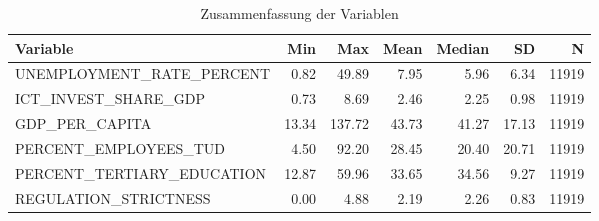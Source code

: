 
\begin{table}[!h]
\centering
\caption{Zusammenfassung der Variablen}
\centering
\begin{tabular}[t]{lrrrrrr}
\toprule
Variable & Min & Max & Mean & Median & SD & N\\
\midrule
UNEMPLOYMENT\_RATE\_PERCENT & 0.82 & 49.89 & 7.95 & 5.96 & 6.34 & 11919\\
ICT\_INVEST\_SHARE\_GDP & 0.73 & 8.69 & 2.46 & 2.25 & 0.98 & 11919\\
GDP\_PER\_CAPITA & 13.34 & 137.72 & 43.73 & 41.27 & 17.13 & 11919\\
PERCENT\_EMPLOYEES\_TUD & 4.50 & 92.20 & 28.45 & 20.40 & 20.71 & 11919\\
PERCENT\_TERTIARY\_EDUCATION & 12.87 & 59.96 & 33.65 & 34.56 & 9.27 & 11919\\
\addlinespace
REGULATION\_STRICTNESS & 0.00 & 4.88 & 2.19 & 2.26 & 0.83 & 11919\\
\bottomrule
\end{tabular}
\end{table}
